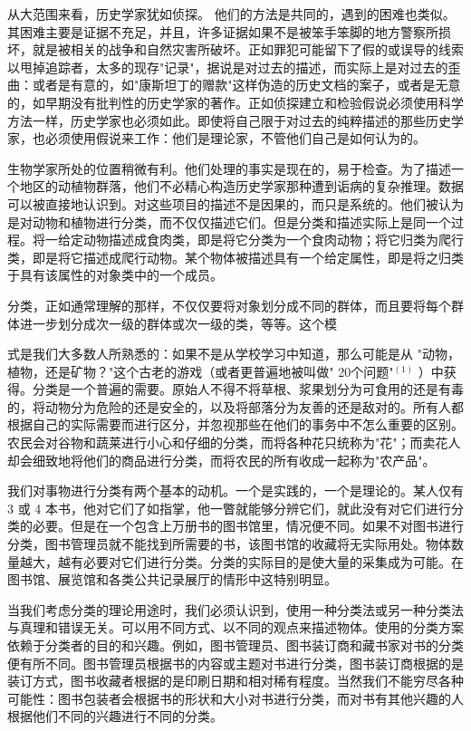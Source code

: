 从大范围来看，历史学家犹如侦探。\cite{collingwood1939} 他们的方法是共同的，遇到的困难也类似。其困难主要是证据不充足，并且，许多证据如果不是被笨手笨脚的地方警察所损坏，就是被相关的战争和自然灾害所破坏。正如罪犯可能留下了假的或误导的线索以甩掉追踪者，太多的现存"记录"，据说是对过去的描述，而实际上是对过去的歪曲：或者是有意的，如"康斯坦丁的赠款"这样伪造的历史文档的案子，或者是无意的，如早期没有批判性的历史学家的著作。正如侦探建立和检验假说必须使用科学方法一样，历史学家也必须如此。即使将自己限于对过去的纯粹描述的那些历史学家，也必须使用假说来工作：他们是理论家，不管他们自己是如何认为的。

生物学家所处的位置稍微有利。他们处理的事实是现在的，易于检查。为了描述一个地区的动植物群落，他们不必精心构造历史学家那种遭到诟病的复杂推理。数据可以被直接地认识到。对这些项目的描述不是因果的，而只是系统的。他们被认为是对动物和植物进行分类，而不仅仅描述它们。但是分类和描述实际上是同一个过程。将一给定动物描述成食肉类，即是将它分类为一个食肉动物；将它归类为爬行类，即是将它描述成爬行动物。某个物体被描述具有一个给定属性，即是将之归类于具有该属性的对象类中的一个成员。

分类，正如通常理解的那样，不仅仅要将对象划分成不同的群体，而且要将每个群体进一步划分成次一级的群体或次一级的类，等等。这个模

式是我们大多数人所熟悉的：如果不是从学校学习中知道，那么可能是从 "动物，植物，还是矿物？"这个古老的游戏（或者更普遍地被叫做" 20个问题"${ }^{(1)}$ ）中获得。分类是一个普遍的需要。原始人不得不将草根、浆果划分为可食用的还是有毒的，将动物分为危险的还是安全的，以及将部落分为友善的还是敌对的。所有人都根据自己的实际需要而进行区分，并忽视那些在他们的事务中不怎么重要的区别。农民会对谷物和蔬莱进行小心和仔细的分类，而将各种花只统称为"花"；而卖花人却会细致地将他们的商品进行分类，而将农民的所有收成一起称为"农产品"。

我们对事物进行分类有两个基本的动机。一个是实践的，一个是理论的。某人仅有 3 或 4 本书，他对它们了如指掌，他一瞥就能够分辨它们，就此没有对它们进行分类的必要。但是在一个包含上万册书的图书馆里，情况便不同。如果不对图书进行分类，图书管理员就不能找到所需要的书，该图书馆的收藏将无实际用处。物体数量越大，越有必要对它们进行分类。分类的实际目的是使大量的采集成为可能。在图书馆、展览馆和各类公共记录展厅的情形中这特别明显。

当我们考虑分类的理论用途时，我们必须认识到，使用一种分类法或另一种分类法与真理和错误无关。可以用不同方式、以不同的观点来描述物体。使用的分类方案依赖于分类者的目的和兴趣。例如，图书管理员、图书装订商和藏书家对书的分类便有所不同。图书管理员根据书的内容或主题对书进行分类，图书装订商根据的是装订方式，图书收藏者根据的是印刷日期和相对稀有程度。当然我们不能穷尽各种可能性：图书包装者会根据书的形状和大小对书进行分类，而对书有其他兴趣的人根据他们不同的兴趣进行不同的分类。

